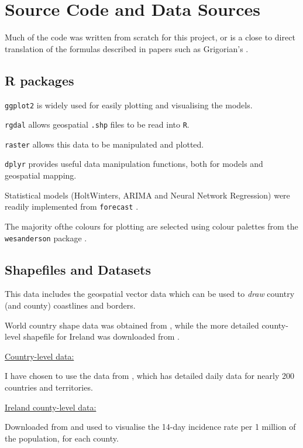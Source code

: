\section{Source Code and Data Sources}
\label{ch:codesource}

Much of the code was written from scratch for this project, or is a close to direct translation of the formulas described in papers such as Grigorian's \cite{grigor20}.

\subsection{R packages}

\noindent

\verb|ggplot2|  \cite{ggplot2} is widely used for easily plotting and visualising the models. 

\verb|rgdal| \cite{rgdal} allows geospatial \verb|.shp| files to be read into \verb|R|. 

\verb|raster| \cite{raster} allows this data to be manipulated and plotted. 

\verb|dplyr| \cite{dplyr}  provides useful data manipulation functions, both for models and geospatial mapping. 

Statistical models (HoltWinters, ARIMA and Neural Network Regression) were readily implemented from \verb|forecast| \cite{forecast}.

The majority ofthe colours for plotting are selected using colour palettes from the \verb|wesanderson| package \cite{wesanderson20}.

\subsection{Shapefiles and Datasets}

This data includes the geospatial vector data which can be used to \textit{draw} country (and county) coastlines and borders. 

World country shape data was obtained from \cite{countryshape}, while the more detailed county-level shapefile for Ireland was downloaded from \cite{countyshape}.

\underline{Country-level data:}

I have chosen to use the data from  \cite{countrydata}, which has detailed daily data for nearly 200 countries and territories.

\underline{Ireland county-level data:}

Downloaded from \cite{irelanddata} and used to visualise the 14-day incidence rate per 1 million of the population, for each county.

